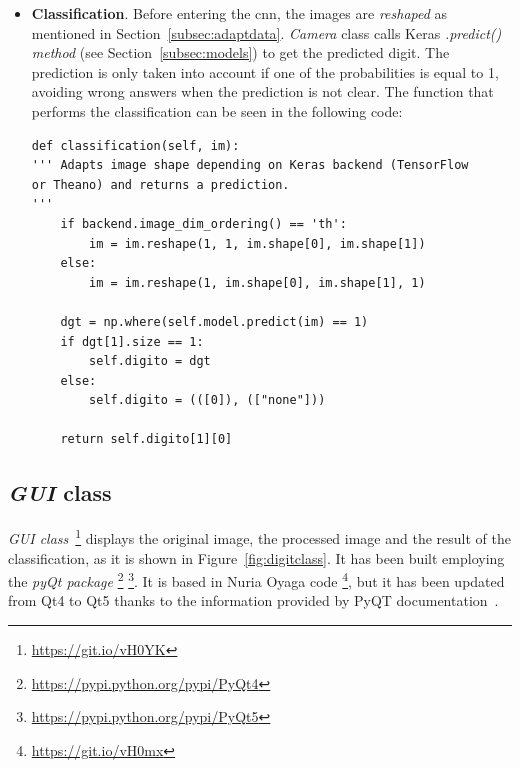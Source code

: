 \begin{itemize}
\begin{lstlisting}[frame=single]
	im_res = cv2.resize(im_blur, (28, 28))
	
	# Edge extraction.
	im_sobel_x = cv2.Sobel(im_res, cv2.CV_32F, 1, 0, ksize=5)
	im_sobel_y = cv2.Sobel(im_res, cv2.CV_32F, 0, 1, ksize=5)
	im_edges = cv2.add(abs(im_sobel_x), abs(im_sobel_y))
	im_edges = cv2.normalize(im_edges, None, 0, 255, cv2.NORM_MINMAX)
	im_edges = np.uint8(im_edges)
	
	return im_edges
\end{lstlisting}
	
	\item \textbf{Classification}. Before entering the \gls{cnn}, the images are \emph{reshaped} as mentioned in Section~\ref{subsec:adaptdata}. \textit{Camera} class calls Keras \emph{\textit{.predict()} method} (see Section~\ref{subsec:models}) to get the predicted digit. The prediction is only taken into account if one of the probabilities is equal to 1, avoiding wrong answers when the prediction is not clear. The function that performs the classification can be seen in the following code:
\begin{lstlisting}
def classification(self, im):
''' Adapts image shape depending on Keras backend (TensorFlow
or Theano) and returns a prediction.
'''
	if backend.image_dim_ordering() == 'th':
		im = im.reshape(1, 1, im.shape[0], im.shape[1])            
	else:      
		im = im.reshape(1, im.shape[0], im.shape[1], 1)            
	
	dgt = np.where(self.model.predict(im) == 1)
	if dgt[1].size == 1:
		self.digito = dgt
	else:
		self.digito = (([0]), (["none"]))
	
	return self.digito[1][0]
\end{lstlisting}
\end{itemize}

\subsection{\textit{GUI} class}
\emph{\textit{GUI} class}~\footnote{\url{https://git.io/vH0YK}} displays the original image, the processed image and the result of the classification, as it is shown in Figure~\ref{fig:digitclass}. It has been built employing the \emph{pyQt package} \footnote{\url{https://pypi.python.org/pypi/PyQt4}} \footnote{\url{https://pypi.python.org/pypi/PyQt5}}. It is based in Nuria Oyaga code \footnote{\url{https://git.io/vH0mx}}, but it has been updated from Qt4  to Qt5  thanks to the information provided by PyQT documentation~\cite{pyqt5}.

